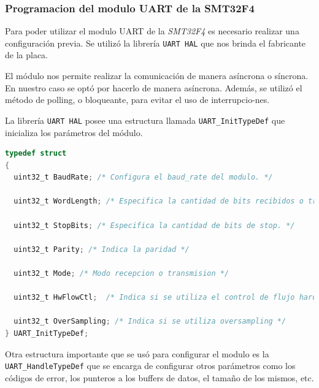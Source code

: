 \documentclass[12pt]{article}
\begin{document}
\subsubsection{Programacion del modulo UART de la SMT32F4}
Para poder utilizar el modulo UART de la \textit{SMT32F4} es necesario realizar una configuración previa. Se utilizó la librería \texttt{UART HAL} que nos brinda el fabricante de la placa.

El módulo nos permite realizar la comunicación de manera asíncrona o síncrona. En nuestro caso se optó por hacerlo de manera asíncrona. Además, se utilizó el método de polling, o bloqueante, para evitar el uso de interrupcio-nes.

La librería \texttt{UART HAL} posee una estructura llamada \texttt{UART\_InitTypeDef} que inicializa los parámetros del módulo.

\begin{lstlisting}[language=C]
  typedef struct
{
  uint32_t BaudRate; /* Configura el baud_rate del modulo. */

  uint32_t WordLength; /* Especifica la cantidad de bits recibidos o transmitidos en un frame. */

  uint32_t StopBits; /* Especifica la cantidad de bits de stop. */

  uint32_t Parity; /* Indica la paridad */

  uint32_t Mode; /* Modo recepcion o transmision */

  uint32_t HwFlowCtl;  /* Indica si se utiliza el control de flujo hardware */

  uint32_t OverSampling; /* Indica si se utiliza oversampling */
} UART_InitTypeDef;

\end{lstlisting}

Otra estructura importante que se usó para configurar el modulo es la \texttt{UART\_HandleTypeDef} que se encarga de configurar otros parámetros como los códigos de error, los punteros a los buffers de datos, el tamaño de los mismos, etc.
\end{document}
